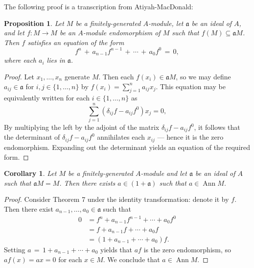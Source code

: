\documentclass[11pt]{article}
\newtheorem{proposition}{Proposition}
\newtheorem{corollary}{Corollary}
\newcommand{\Ann}{\operatorname{Ann}}
\begin{document}
The following proof is a transcription from Atiyah-MacDonald:

\begin{adjustwidth}{0.5cm}{}
	\begin{proposition}
		Let $M$ be a finitely-generated $A$-module, let $\mathfrak{a}$ be an ideal of $A$, and let $f : M \to M$ be an $A$-module endomorphism of $M$ such that $f(M) \subseteq \mathfrak{a}M$. Then $f$ satisfies an equation of the form
		\[
			f^{n} \, + \, a_{n - 1} f^{n - 1} \, + \, \cdots \, + \, a_{0} f^{0} \, = \, 0,
		\]
		where each $a_{i}$ lies in $\mathfrak{a}$.
	\end{proposition}
	\begin{proof}
		Let $x_{1}, \ldots, x_{n}$ generate $M$. Then each $f(x_{i}) \in \mathfrak{a} M$, so we may define $a_{ij} \in \mathfrak{a}$ for $i, j \in \{ 1, \ldots, n \}$ by $f(x_{i}) = \sum_{j = 1}^{n} a_{ij}x_{j}$. This equation may be equivalently written for each $i \in \{ 1, \ldots, n \}$ as
		\[
			\sum\limits_{j = 1}^{n} (\delta_{ij} f - a_{ij} f^{0}) x_{j} = 0,
		\]
    By multiplying the left by the adjoint of the matrix $\delta_{ij} f - a_{ij} f^{0}$, it follows that the determinant of $\delta_{ij} f - a_{ij} f^{0}$ annihilates each $x_{ij}$ --- hence it is the zero endomorphism. Expanding out the determinant yields an equation of the required form.
	\end{proof}
\end{adjustwidth}

\begin{adjustwidth}{0.5cm}{}
	\begin{corollary}
		Let $M$ be a finitely-generated $A$-module and let $\mathfrak{a}$ be an ideal of $A$ such that $\mathfrak{a} M = M$. Then there exists $a \in (1 + \mathfrak{a})$ such that $a \in \Ann M$.
	\end{corollary}
	\begin{proof}
		Consider Theorem 7 under the identity transformation: denote it by $f$. Then there exist $a_{n - 1}, \ldots, a_{0} \in \mathfrak{a}$ such that
		\begin{align*}
			0 &= f^{n} + a_{n - 1} f^{n - 1} + \cdots + a_{0} f^{0} \\
			&= f + a_{n - 1} f + \cdots + a_{0} f \\
			&= (1 + a_{n - 1} + \cdots + a_{0}) f.
		\end{align*}
		Setting $a \, = \, 1 + a_{n - 1} + \cdots + a_{0}$ yields that $a f$ is the zero endomorphism, so $a f(x) = ax = 0$ for each $x \in M$. We conclude that $a \in \Ann M$.
	\end{proof}
\end{adjustwidth}
\end{document}
